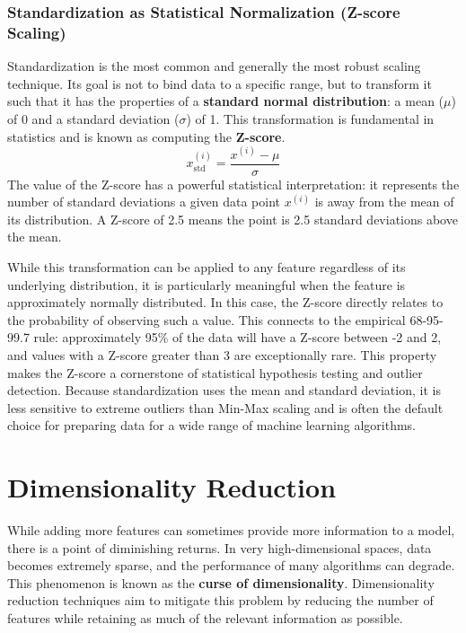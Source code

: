 \subsubsection{Standardization as Statistical Normalization (Z-score Scaling)}
Standardization is the most common and generally the most robust scaling technique. Its goal is not to bind data to a specific range, but to transform it such that it has the properties of a \textbf{standard normal distribution}: a mean ($\mu$) of 0 and a standard deviation ($\sigma$) of 1. This transformation is fundamental in statistics and is known as computing the \textbf{Z-score}.
$$ x_{\text{std}}^{(i)} = \frac{x^{(i)} - \mu}{\sigma} $$
The value of the Z-score has a powerful statistical interpretation: it represents the number of standard deviations a given data point $x^{(i)}$ is away from the mean of its distribution. A Z-score of 2.5 means the point is 2.5 standard deviations above the mean.

While this transformation can be applied to any feature regardless of its underlying distribution, it is particularly meaningful when the feature is approximately normally distributed. In this case, the Z-score directly relates to the probability of observing such a value. This connects to the empirical 68-95-99.7 rule: approximately 95\% of the data will have a Z-score between -2 and 2, and values with a Z-score greater than 3 are exceptionally rare. This property makes the Z-score a cornerstone of statistical hypothesis testing and outlier detection. Because standardization uses the mean and standard deviation, it is less sensitive to extreme outliers than Min-Max scaling and is often the default choice for preparing data for a wide range of machine learning algorithms.

\section{Dimensionality Reduction}
\label{sec:dimensionality_reduction}
While adding more features can sometimes provide more information to a model, there is a point of diminishing returns. In very high-dimensional spaces, data becomes extremely sparse, and the performance of many algorithms can degrade. This phenomenon is known as the \textbf{curse of dimensionality}. Dimensionality reduction techniques aim to mitigate this problem by reducing the number of features while retaining as much of the relevant information as possible.

